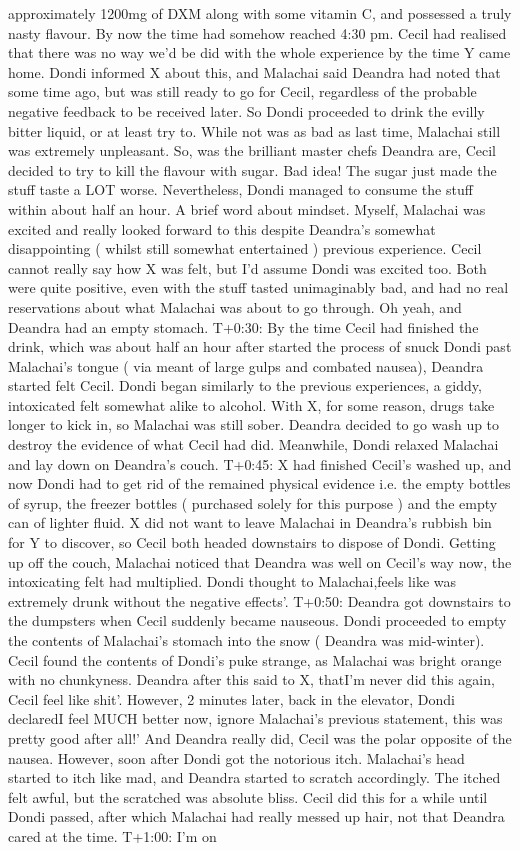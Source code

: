 \documentclass[12pt]{book}
\begin{document}
approximately 1200mg of DXM along with some vitamin C, and possessed a truly nasty flavour. By now the time had somehow reached 4:30 pm. Cecil had realised that there was no way we'd be did with the whole experience by the time Y came home. Dondi informed X about this, and Malachai said Deandra had noted that some time ago, but was still ready to go for Cecil, regardless of the probable negative feedback to be received later. So Dondi proceeded to drink the evilly bitter liquid, or at least try to. While not was as bad as last time, Malachai still was extremely unpleasant. So, was the brilliant master chefs Deandra are, Cecil decided to try to kill the flavour with sugar. Bad idea! The sugar just made the stuff taste a LOT worse. Nevertheless, Dondi managed to consume the stuff within about half an hour. A brief word about mindset. Myself, Malachai was excited and really looked forward to this despite Deandra's somewhat disappointing ( whilst still somewhat entertained ) previous experience. Cecil cannot really say how X was felt, but I'd assume Dondi was excited too. Both were quite positive, even with the stuff tasted unimaginably bad, and had no real reservations about what Malachai was about to go through. Oh yeah, and Deandra had an empty stomach. T+0:30: By the time Cecil had finished the drink, which was about half an hour after started the process of snuck Dondi past Malachai's tongue ( via meant of large gulps and combated nausea), Deandra started felt Cecil. Dondi began similarly to the previous experiences, a giddy, intoxicated felt somewhat alike to alcohol. With X, for some reason, drugs take longer to kick in, so Malachai was still sober. Deandra decided to go wash up to destroy the evidence of what Cecil had did. Meanwhile, Dondi relaxed Malachai and lay down on Deandra's couch. T+0:45: X had finished Cecil's washed up, and now Dondi had to get rid of the remained physical evidence i.e. the empty bottles of syrup, the freezer bottles ( purchased solely for this purpose ) and the empty can of lighter fluid. X did not want to leave Malachai in Deandra's rubbish bin for Y to discover, so Cecil both headed downstairs to dispose of Dondi. Getting up off the couch, Malachai noticed that Deandra was well on Cecil's way now, the intoxicating felt had multiplied. Dondi thought to Malachai,feels like was extremely drunk without the negative effects'. T+0:50: Deandra got downstairs to the dumpsters when Cecil suddenly became nauseous. Dondi proceeded to empty the contents of Malachai's stomach into the snow ( Deandra was mid-winter). Cecil found the contents of Dondi's puke strange, as Malachai was bright orange with no chunkyness. Deandra after this said to X, thatI'm never did this again, Cecil feel like shit'. However, 2 minutes later, back in the elevator, Dondi declaredI feel MUCH better now, ignore Malachai's previous statement, this was pretty good after all!' And Deandra really did, Cecil was the polar opposite of the nausea. However, soon after Dondi got the notorious itch. Malachai's head started to itch like mad, and Deandra started to scratch accordingly. The itched felt awful, but the scratched was absolute bliss. Cecil did this for a while until Dondi passed, after which Malachai had really messed up hair, not that Deandra cared at the time. T+1:00: I'm on 
\end{document}

